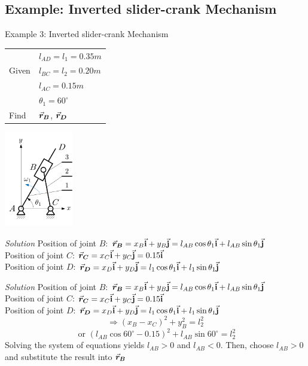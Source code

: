 \subsection{Example: Inverted slider-crank Mechanism}

\begin{frame}
	\begin{block}{Example 3: Inverted slider-crank Mechanism}
		\begin{table}
			\begin{minipage}{0.5\linewidth}
				\begin{tabular}{l|l}
					      & $l_{AD}=l_1=0.35m$\\
					Given & $l_{BC}=l_2=0.20m$\\
					      & $l_{AC}=0.15m$\\
					      & $\theta_1=60^{\circ}$\\\hline
					Find  & $\vec{\bm{r}}_{\bm{B}}$, $\vec{\bm{r}}_{\bm{D}}$
				\end{tabular}
			\end{minipage}\hfill
				\begin{minipage}{0.5\linewidth}
					\includegraphics[width=30mm]{images/Inverted-R-RRT.png}
				\end{minipage}
		\end{table}
	\end{block}
\emph{Solution}\vskip2.5mm
Position of joint $B$: $\displaystyle \vec{\bm{r}}_{\bm{B}} = x_B\vec{\mathbf{i}} + y_B\vec{\mathbf{j}} = l_{AB}\cos{\theta_1}\vec{\mathbf{i}} + l_{AB}\sin{\theta_1}\vec{\mathbf{j}}$\\
Position of joint $C$: $\displaystyle \vec{\bm{r}}_{\bm{C}} = x_C\vec{\mathbf{i}} + y_C\vec{\mathbf{j}} = 0.15\vec{\mathbf{i}}$\\
Position of joint $D$: $\displaystyle \vec{\bm{r}}_{\bm{D}} = x_D\vec{\mathbf{i}} + y_D\vec{\mathbf{j}} = l_1\cos{\theta_1}\vec{\mathbf{i}} + l_1\sin{\theta_1}\vec{\mathbf{j}}$
\end{frame}

\begin{frame}
\emph{Solution}\vskip2.5mm
Position of joint $B$: $\displaystyle \vec{\bm{r}}_{\bm{B}} = x_B\vec{\mathbf{i}} + y_B\vec{\mathbf{j}} = l_{AB}\cos{\theta_1}\vec{\mathbf{i}} + l_{AB}\sin{\theta_1}\vec{\mathbf{j}}$\\
Position of joint $C$: $\displaystyle \vec{\bm{r}}_{\bm{C}} = x_C\vec{\mathbf{i}} + y_C\vec{\mathbf{j}} = 0.15\vec{\mathbf{i}}$\\
Position of joint $D$: $\displaystyle \vec{\bm{r}}_{\bm{D}} = x_D\vec{\mathbf{i}} + y_D\vec{\mathbf{j}} = l_1\cos{\theta_1}\vec{\mathbf{i}}+l_1\sin{\theta_1}\vec{\mathbf{j}}$
\[
\Rightarrow\displaystyle(x_B-x_C)^2+y_B^2=l_2^2
\]
\[
\text{ or } (l_{AB}\cos{60^\circ}-0.15)^2+l_{AB}\sin{60^\circ}=l_2^2
\]
Solving the system of equations yields $l_{AB}>0$ and $l_{AB}<0$. Then, choose $l_{AB}>0$ and substitute the result into $\vec{\bm{r}}_{\bm{B}}$
\end{frame}


